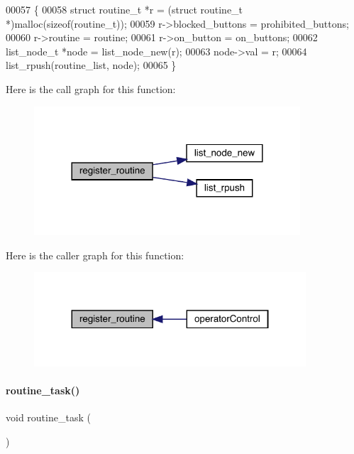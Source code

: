 \begin{DoxyCode}
00057                                                     \{
00058   \textcolor{keyword}{struct }routine_t *r = (\textcolor{keyword}{struct }routine_t *)malloc(\textcolor{keyword}{sizeof}(routine_t));
00059   r->blocked_buttons = prohibited\_buttons;
00060   r->routine = routine;
00061   r->on_button = on\_buttons;
00062   list_node_t *node = list_node_new(r);
00063   node->val = r;
00064   list_rpush(routine_list, node);
00065 \}
\end{DoxyCode}
Here is the call graph for this function\+:
\nopagebreak
\begin{figure}[H]
\begin{center}
\leavevmode
\includegraphics[width=281pt]{routines_8h_a9486ebd51b8c3d966619cf4617e6a930_cgraph}
\end{center}
\end{figure}
Here is the caller graph for this function\+:
\nopagebreak
\begin{figure}[H]
\begin{center}
\leavevmode
\includegraphics[width=287pt]{routines_8h_a9486ebd51b8c3d966619cf4617e6a930_icgraph}
\end{center}
\end{figure}
\mbox{\label{routines_8h_a230cdcefb410a429fb6baba1f88fc9ba}} 
\paragraph{routine\+\_\+task()}
{\footnotesize\ttfamily void routine\+\_\+task (\begin{DoxyParamCaption}{ }\end{DoxyParamCaption})}



